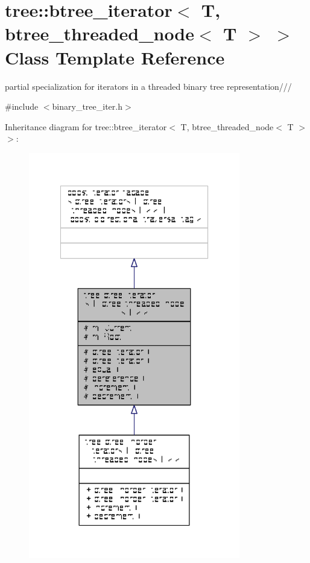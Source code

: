 \hypertarget{classtree_1_1btree__iterator_3_01T_00_01btree__threaded__node_3_01T_01_4_01_4}{\section{tree\-:\-:btree\-\_\-iterator$<$ T, btree\-\_\-threaded\-\_\-node$<$ T $>$ $>$ Class Template Reference}
\label{classtree_1_1btree__iterator_3_01T_00_01btree__threaded__node_3_01T_01_4_01_4}
}


partial specialization for iterators in a threaded binary tree representation///  




{\ttfamily \#include $<$binary\-\_\-tree\-\_\-iter.\-h$>$}



Inheritance diagram for tree\-:\-:btree\-\_\-iterator$<$ T, btree\-\_\-threaded\-\_\-node$<$ T $>$ $>$\-:
\nopagebreak
\begin{figure}[H]
\begin{center}
\leavevmode
\includegraphics[width=262pt]{classtree_1_1btree__iterator_3_01T_00_01btree__threaded__node_3_01T_01_4_01_4__inherit__graph}
\end{center}
\end{figure}


